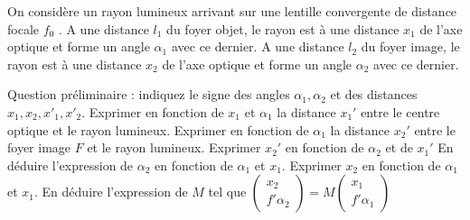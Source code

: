 \begin{Exercise}[title=Traitement Matriciel]
   On considère un rayon lumineux arrivant sur une lentille convergente de
   distance focale $f_0$ . A une distance $l_1$ du foyer objet, le rayon est à
   une distance $x_1$ de l'axe optique et forme un angle $\alpha_1$ avec ce dernier.
   A une distance $l_2$ du foyer image, le rayon est à une distance $x_2$ de
   l'axe optique et forme un angle $\alpha_2$ avec ce dernier.
   \begin{center}
   \end{center}

Question préliminaire : indiquez le signe des angles $\alpha_1,\alpha_2$
et des distances $x_1,x_2,x'_1,x'_2$.
\Question Exprimer en fonction de $x_1$ et $\alpha_1$ la distance $x_1'$ entre le centre optique et le rayon lumineux.
\Question Exprimer en fonction de $\alpha_1$ la distance $x_2'$ entre le foyer image
$F$ et le rayon lumineux.
\Question Exprimer $x_2'$ en fonction de $\alpha_2$ et de $x_1'$ En déduire
l'expression de $\alpha_2$ en fonction de $\alpha_1$ et $x_1$.
\Question Exprimer $x_2$ en fonction de $\alpha_1$ et $x_1$.
En déduire l'expression de $M$ tel que  $
\begin{pmatrix}
  x_2\\
f'\alpha_2
\end{pmatrix} = M
\begin{pmatrix}
  x_1\\
  f'\alpha_1
\end{pmatrix}
$

\end{Exercise}
